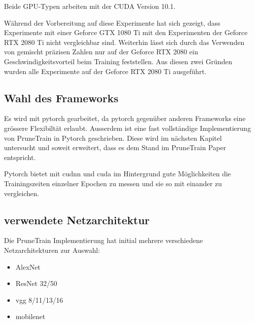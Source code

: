 Beide GPU-Typen arbeiten mit der CUDA Version 10.1. 

Während der Vorbereitung auf diese Experimente hat sich gezeigt, dass Experimente mit einer Geforce GTX 1080 Ti mit den Experimenten der Geforce RTX 2080 Ti nicht vergleichbar sind. Weiterhin lässt sich durch das Verwenden von gemischt präzisen Zahlen nur auf der Geforce RTX 2080 ein Geschwindigkeitsvorteil beim Training feststellen. Aus diesen zwei Gründen wurden alle Experimente auf der Geforce RTX 2080 Ti ausgeführt.  


\subsection{Wahl des Frameworks}

Es wird mit pytorch gearbeitet, da pytorch gegenüber anderen Frameworks eine grössere Flexibiltät erlaubt. Ausserdem ist eine fast vollständige Implementierung von PruneTrain in Pytorch geschrieben. Diese wird im nächsten Kapitel untersucht und soweit erweitert, dass es dem Stand im PruneTrain Paper entspricht.

Pytorch bietet mit cudnn und cuda im Hintergrund gute Möglichkeiten die Trainingszeiten einzelner Epochen zu messen und sie so mit einander zu vergleichen.


\subsection{verwendete Netzarchitektur}\label{sec:archi}
Die PruneTrain Implementierung hat initial mehrere verschiedene Netzarchitekturen zur Auswahl:
\begin{itemize}
 \item AlexNet
 \item ResNet 32/50
 \item vgg 8/11/13/16
 \item mobilenet
\end{itemize}

